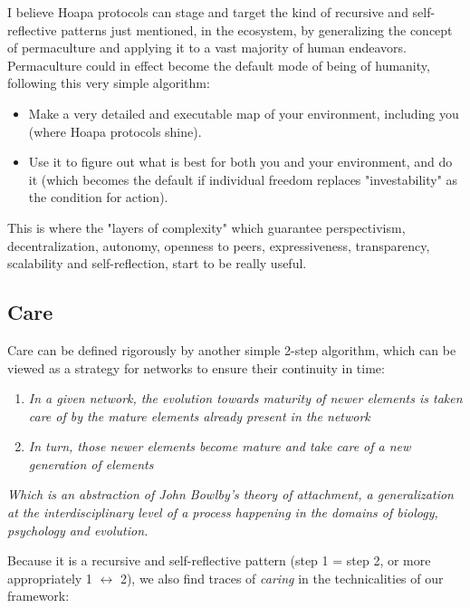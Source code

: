 \documentclass[11pt]{article}
\begin{document}
I believe Hoapa protocols can stage and target the kind of recursive and self-reflective patterns just mentioned, in the ecosystem, by generalizing the concept of permaculture and applying it to a vast majority of human endeavors. Permaculture could in effect become the default mode of being of humanity, following this very simple algorithm:

\begin{itemize}

\item Make a very detailed and executable map of your environment, including you (where Hoapa protocols shine).

\item Use it to figure out what is best for both you and your environment, and do it (which becomes the default if individual freedom replaces "investability" as the condition for action).

\end{itemize}

This is where the "layers of complexity" which guarantee perspectivism, decentralization, autonomy, openness to peers, expressiveness, transparency, scalability and self-reflection, start to be really useful.

\subsection{Care}

Care can be defined rigorously by another simple 2-step algorithm, which can be viewed as a strategy for networks to ensure their continuity in time:

\begin{enumerate}

\item \emph{In a given network, the evolution towards maturity of newer elements is taken care of by the mature elements already present in the network}

\item \emph{In turn, those newer elements become mature and take care of a new generation of elements}

\end{enumerate}

\emph{Which is an abstraction of John Bowlby's theory of attachment, a generalization at the interdisciplinary level of a process happening in the domains of biology, psychology and evolution.}

Because it is a recursive and self-reflective pattern (step 1 = step 2, or more appropriately 1 \ensuremath{\leftrightarrow} 2), we also find traces of \emph{caring} in the technicalities of our framework:
\end{document}
